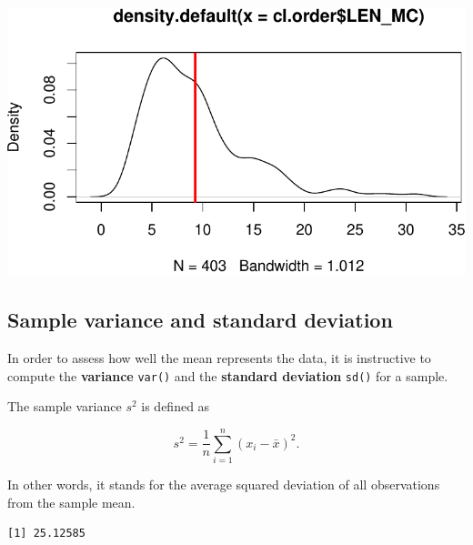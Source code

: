 \documentclass[
  11pt,
  letterpaper,
  DIV=11,
  numbers=noendperiod]{scrreprt}
\newenvironment{Shaded}{\begin{snugshade}}{\end{snugshade}}
\newcommand{\CommentTok}[1]{\textcolor[rgb]{0.37,0.37,0.37}{#1}}
\newcommand{\FunctionTok}[1]{\textcolor[rgb]{0.28,0.35,0.67}{#1}}
\newcommand{\NormalTok}[1]{\textcolor[rgb]{0.00,0.23,0.31}{#1}}
\newcommand{\SpecialCharTok}[1]{\textcolor[rgb]{0.37,0.37,0.37}{#1}}
\begin{document}
\includegraphics{Summary_statistics_files/figure-pdf/unnamed-chunk-13-1.pdf}

\subsection{Sample variance and standard
deviation}\label{sample-variance-and-standard-deviation}

In order to assess how well the mean represents the data, it is
instructive to compute the \textbf{variance} \texttt{var()} and the
\textbf{standard deviation} \texttt{sd()} for a sample.

The sample variance \(s^2\) is defined as

\[s^2 = \frac{1}{n}\sum_{i=1}^n{(x_i - \bar{x})^2}. \]

In other words, it stands for the average squared deviation of all
observations from the sample mean.

\begin{Shaded}
\end{Shaded}

\begin{verbatim}
[1] 25.12585
\end{verbatim}
\end{document}
